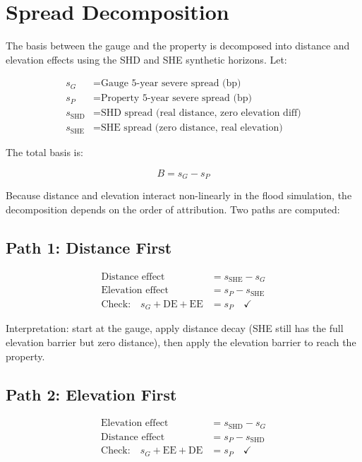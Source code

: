 \documentclass[11pt,a4paper]{article}
\begin{document}
\section{Spread Decomposition}
\label{sec:decomp}

The basis between the gauge and the property is decomposed into distance and elevation
effects using the SHD and SHE synthetic horizons. Let:

\begin{align}
    s_G &= \text{Gauge 5-year severe spread (bp)} \\
    s_P &= \text{Property 5-year severe spread (bp)} \\
    s_{\text{SHD}} &= \text{SHD spread (real distance, zero elevation diff)} \\
    s_{\text{SHE}} &= \text{SHE spread (zero distance, real elevation)}
\end{align}

\noindent The total basis is:

\begin{equation}
    B = s_G - s_P
\end{equation}

\noindent Because distance and elevation interact non-linearly in the flood simulation,
the decomposition depends on the order of attribution. Two paths are computed:

\subsection{Path 1: Distance First}

\begin{align}
    \text{Distance effect} &= s_{\text{SHE}} - s_G \\
    \text{Elevation effect} &= s_P - s_{\text{SHE}} \\
    \text{Check:}\quad s_G + \text{DE} + \text{EE} &= s_P \quad \checkmark
\end{align}

\noindent Interpretation: start at the gauge, apply distance decay (SHE still has the
full elevation barrier but zero distance), then apply the elevation barrier to reach the
property.

\subsection{Path 2: Elevation First}

\begin{align}
    \text{Elevation effect} &= s_{\text{SHD}} - s_G \\
    \text{Distance effect} &= s_P - s_{\text{SHD}} \\
    \text{Check:}\quad s_G + \text{EE} + \text{DE} &= s_P \quad \checkmark
\end{align}
\end{document}
